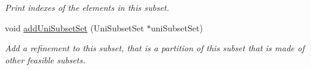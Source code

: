 \begin{DoxyCompactItemize}
\begin{DoxyCompactList}\small\item\em Print indexes of the elements in this subset. \end{DoxyCompactList}\item 
\hypertarget{classUniSubset_a7000de6419fa5cdd69b577dbdb6f4b59}{void \hyperlink{classUniSubset_a7000de6419fa5cdd69b577dbdb6f4b59}{add\-Uni\-Subset\-Set} (Uni\-Subset\-Set $\ast$uni\-Subset\-Set)}\label{classUniSubset_a7000de6419fa5cdd69b577dbdb6f4b59}

\begin{DoxyCompactList}\small\item\em Add a refinement to this subset, that is a partition of this subset that is made of other feasible subsets. \end{DoxyCompactList}\end{DoxyCompactItemize}
